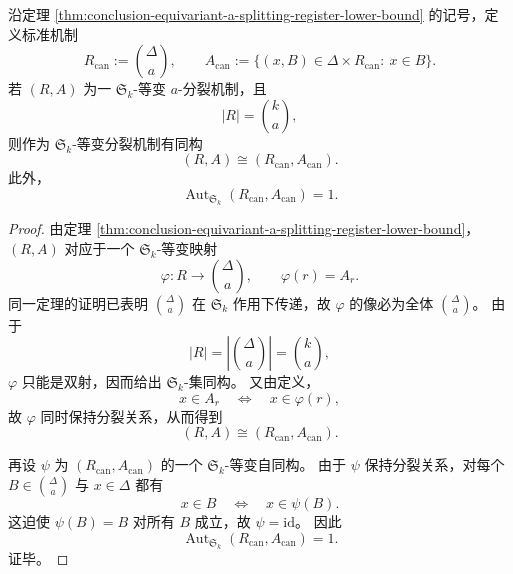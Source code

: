 \begin{theorem}\label{thm:conclusion-equivariant-a-splitting-rigidity}
沿定理 \ref{thm:conclusion-equivariant-a-splitting-register-lower-bound} 的记号，定义标准机制
\[
R_{\mathrm{can}}:=\binom{\Delta}{a},
\qquad
A_{\mathrm{can}}
:=
\{(x,B)\in \Delta\times R_{\mathrm{can}}:\ x\in B\}.
\]
若 \((R,A)\) 为一 \(\mathfrak S_k\)-等变 \(a\)-分裂机制，且
\[
|R|=\binom{k}{a},
\]
则作为 \(\mathfrak S_k\)-等变分裂机制有同构
\[
(R,A)\cong (R_{\mathrm{can}},A_{\mathrm{can}}).
\]
此外，
\[
\operatorname{Aut}_{\mathfrak S_k}(R_{\mathrm{can}},A_{\mathrm{can}})=1.
\]
\end{theorem}
\begin{proof}
由定理 \ref{thm:conclusion-equivariant-a-splitting-register-lower-bound}，\((R,A)\) 对应于一个 \(\mathfrak S_k\)-等变映射
\[
\varphi:R\to \binom{\Delta}{a},
\qquad
\varphi(r)=A_r.
\]
同一定理的证明已表明 \(\binom{\Delta}{a}\) 在 \(\mathfrak S_k\) 作用下传递，故 \(\varphi\) 的像必为全体 \(\binom{\Delta}{a}\)。
由于
\[
|R|=\left|\binom{\Delta}{a}\right|=\binom{k}{a},
\]
\(\varphi\) 只能是双射，因而给出 \(\mathfrak S_k\)-集同构。
又由定义，
\[
x\in A_r
\quad\Longleftrightarrow\quad
x\in \varphi(r),
\]
故 \(\varphi\) 同时保持分裂关系，从而得到
\[
(R,A)\cong (R_{\mathrm{can}},A_{\mathrm{can}}).
\]
\par
再设 \(\psi\) 为 \((R_{\mathrm{can}},A_{\mathrm{can}})\) 的一个 \(\mathfrak S_k\)-等变自同构。
由于 \(\psi\) 保持分裂关系，对每个 \(B\in \binom{\Delta}{a}\) 与 \(x\in \Delta\) 都有
\[
x\in B
\quad\Longleftrightarrow\quad
x\in \psi(B).
\]
这迫使 \(\psi(B)=B\) 对所有 \(B\) 成立，故 \(\psi=\mathrm{id}\)。
因此
\[
\operatorname{Aut}_{\mathfrak S_k}(R_{\mathrm{can}},A_{\mathrm{can}})=1.
\]
证毕。
\end{proof}

